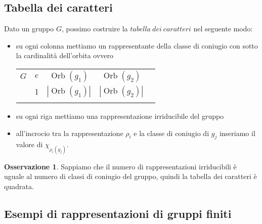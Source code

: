 \documentclass[11pt]{article}
\theoremstyle{plain}
\theoremstyle{definition}
\newtheorem*{rem}{Osservazione}
\theoremstyle{remark}
\DeclareMathOperator{\Orb}{Orb}
\begin{document}
\subsection{Tabella dei caratteri}


Dato un gruppo $G$, possimo costruire la $tabella\ dei\ caratteri$ nel seguente modo:
\begin{itemize}
\item su ogni colonna mettiamo un rappresentante della classe di coniugio con sotto la cardinalità dell'orbita ovvero

\begin{table}[!ht]
\centering
\begin{tabular}{|c|c|c|c|c}
\hline
$G$  & $e$ & $\Orb(g_1)$ & $\Orb(g_2)$ & \\
 & 1 & $|\Orb(g_1)|$ & $|\Orb(g_2)|$ & \\
\hline
 & &  & \\
\end{tabular}
\end{table}

\item su ogni riga mettiamo una rappresentazione irriducibile del gruppo
\item all'incrocio tra la rappresentazione $\rho_i$ e la classe di coniugio di $g_j$ inseriamo il valore di $\chi_{\rho_i(g_j)}$.


\end{itemize}

\begin{rem}
 Sappiamo che il numero di rappresentazioni irriducibili è uguale al numero di classi di coniugio del gruppo, quindi
 la tabella dei caratteri è quadrata.
\end{rem}



\subsection{Esempi di rappresentazioni di gruppi finiti}
\end{document}
